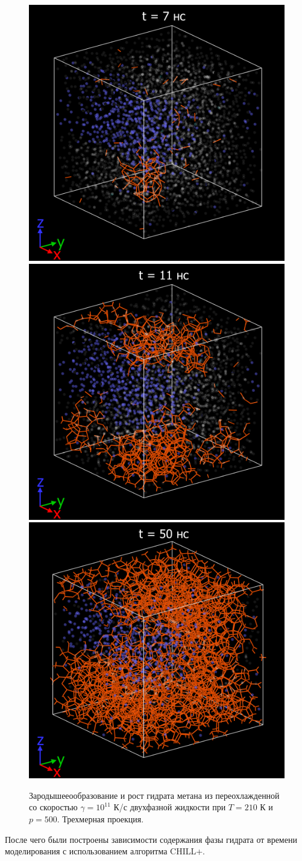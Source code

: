 \begin{figure}[H]
    \centering
    \begin{minipage}{\linewidth}
        \includegraphics[width=.325\linewidth]{figures/nuclei7.png}
        \includegraphics[width=.325\linewidth]{figures/nuclei8.png}
        \includegraphics[width=.325\linewidth]{figures/nuclei9.png}
    \end{minipage}
    \caption{Зародышееообразование и рост гидрата метана из переохлажденной со скоростью $\gamma=10^{11}$ К/с двухфазной жидкости при $T=210$ К и $p=500$. Трехмерная проекция.}
    \label{fig3.6}
\end{figure}

После чего были построены зависимости содержания фазы гидрата от времени моделирования с использованием алгоритма CHILL+.

